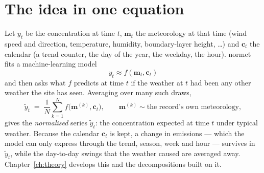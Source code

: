\documentclass[11pt]{report}
\newcommand{\nm}{\textsf{normet}}
\begin{document}
\section{The idea in one equation}
Let $y_t$ be the concentration at time $t$, $\mathbf{m}_t$ the meteorology at that time
(wind speed and direction, temperature, humidity, boundary-layer height, \dots) and
$\mathbf{c}_t$ the calendar (a trend counter, the day of the year, the weekday, the hour).
\nm{} fits a machine-learning model
\begin{equation}
  y_t \approx f(\mathbf{m}_t, \mathbf{c}_t)
\end{equation}
and then asks what $f$ predicts at time $t$ if the weather at $t$ had been any other
weather the site has seen. Averaging over many such draws,
\begin{equation}
  \tilde{y}_t \;=\; \frac{1}{N}\sum_{k=1}^{N} f\bigl(\mathbf{m}^{(k)}, \mathbf{c}_t\bigr),
  \qquad \mathbf{m}^{(k)} \sim \text{the record's own meteorology},
  \label{eq:norm}
\end{equation}
gives the \emph{normalised} series $\tilde{y}_t$: the concentration expected at time $t$
under typical weather. Because the calendar $\mathbf{c}_t$ is kept, a change in
emissions --- which the model can only express through the trend, season, week and
hour --- survives in $\tilde{y}_t$, while the day-to-day swings that the weather caused
are averaged away. Chapter~\ref{ch:theory} develops this and the decompositions built on
it.
\end{document}

